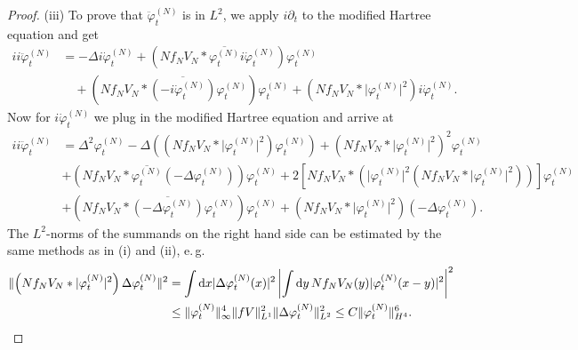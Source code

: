 \documentclass[11pt,a4paper,DIV11]{scrartcl}	%
\newcommand{\di}{\textrm{d}}		%
\newcommand{\cc}[1]{\overline{#1}}	%
\newcommand{\norm}[1]{\lVert#1\rVert}	%
\newcommand{\ph}{\varphi_t^{(N)}}	%
\newcommand{\phdot}{\dot{\varphi}_t^{(N)}}	%
\newcommand{\phddot}{\ddot{\varphi}_t^{(N)}}	%
\begin{document}
\begin{proof}
(iii) To prove that $\phddot$ is in $L^2$, we apply $i\partial_t$ to the modified Hartree equation and get
\begin{align*}
ii\phddot & = - \Delta i \phdot + \left( N f_N V_N \ast \cc{\ph}i \phdot \right) \ph \\
& \quad + \left( N f_N V_N \ast \cc{(-i\phdot)} \ph \right) \ph + \left( N f_N V_N \ast \lvert\ph\rvert^2 \right) i\phdot.
\end{align*}
Now for $i\phdot$ we plug in the modified Hartree equation and arrive at
\begin{align*}
ii \phddot & = \Delta^2 \ph - \Delta \left( (N f_N V_N \ast \lvert \ph\rvert^2)\ph \right) + \left( N f_N V_N \ast \lvert \ph\rvert^2 \right)^2 \ph \\
& + (N f_N V_N \ast \cc{\ph}(-\Delta \ph))\ph + 2 \left[ N f_N V_N \ast \left( \lvert \ph\rvert^2 (N f_N V_N \ast \lvert \ph\rvert^2) \right) \right] \ph \\
& + (N f_N V_N \ast \cc{(-\Delta \ph)} \ph)\ph + \left( N f_N V_N \ast \lvert \ph \rvert^2 \right)(-\Delta \ph).
\end{align*}
The $L^2$-norms of the summands on the right hand side can be estimated by the same methods as in (i) and (ii), e.\,g.\ 
\begin{align*}
 \norm{\left( N f_N V_N \ast \lvert \ph\rvert^2 \right) \Delta \ph}^2 & = \int \di x \lvert \Delta \ph(x)\rvert^2 \left\lvert \int \di y\, N f_N V_N(y) \lvert \ph(x-y) \rvert^2 \right\rvert^2 \\
& \leq \norm{\ph}_\infty^4 \norm{fV}_{L^1}^2 \norm{\Delta \ph}_{L^2}^2 \leq C \norm{\ph}_{H^4}^6. \qedhere
\end{align*}
\end{proof}
\end{document}
